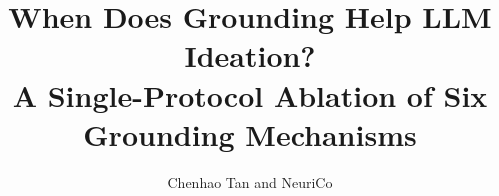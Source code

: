 \documentclass{article}
\title{When Does Grounding Help LLM Ideation?\\ A Single-Protocol Ablation of Six Grounding Mechanisms}
\author{Chenhao Tan and NeuriCo}
\begin{document}
\maketitle

\begin{abstract}

\end{abstract}









\end{document}
